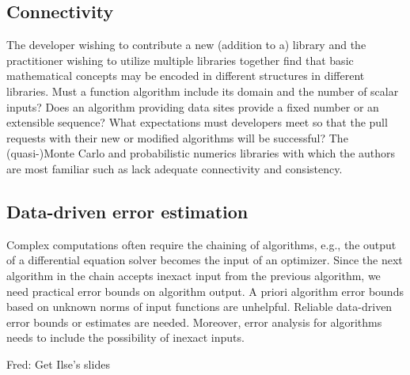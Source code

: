 \documentclass{amsart}
\newcommand{\FJHNote}[1]{{\color{blue}Fred: #1}}
\begin{document}
\subsection{Connectivity} 
The developer wishing to contribute a new (addition to a) library and the practitioner wishing to utilize multiple libraries together find that basic mathematical concepts may be encoded in different structures in different libraries.  Must a function algorithm include its domain and the number of scalar inputs?  Does an algorithm providing data sites provide a fixed number or an extensible sequence?  What expectations must developers meet so that the pull requests with their new or modified algorithms will be successful? The (quasi-)Monte Carlo and probabilistic numerics libraries with which the authors are most familiar such as \cite{QMCPy2020a,SciPyQMC,Stan,probnum} lack  adequate connectivity and consistency.

\subsection{Data-driven error estimation} 
Complex computations often require the chaining of algorithms, e.g., the output of a differential equation solver becomes the input of an optimizer.  Since the next algorithm in the chain accepts inexact input from the previous algorithm, 
we need practical error bounds on algorithm output. A priori algorithm error bounds based on unknown norms of input functions are unhelpful.  Reliable data-driven error bounds or estimates are needed. Moreover, error analysis for algorithms needs to include the possibility of inexact inputs.

\FJHNote{Get Ilse's slides}
\end{document}
